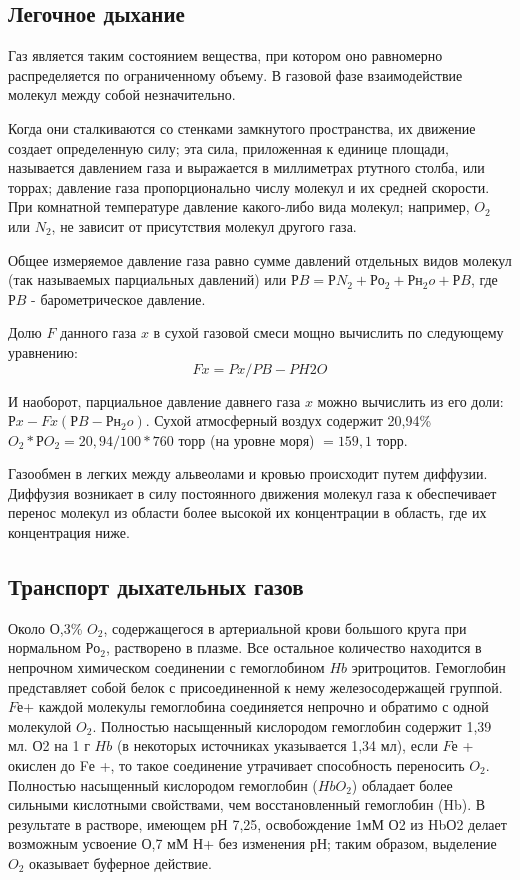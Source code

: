 \documentclass[a4paper,14pt]{extreport}
\begin{document}
\subsection{Легочное  дыхание}

Газ является таким состоянием вещества, при котором оно равномерно распределяется по ограниченному объему. В газовой фазе взаимодействие молекул между собой незначительно.

Когда они сталкиваются со стенками замкнутого пространства, их движение создает определенную силу; эта сила, приложенная к единице площади, называется давлением газа и выражается в миллиметрах ртутного столба, или торрах; давление газа пропорционально числу молекул и их средней скорости. При комнатной температуре давление какого-либо вида молекул; например, $O_2$ или $N_2$, не зависит от присутствия молекул другого газа. 

Общее измеряемое давление газа равно сумме давлений отдельных видов молекул (так называемых парциальных давлений) или $РB=РN_2+Ро_2+Рн_2o+РB$, где $РB$ - барометрическое давление. 

Долю $F$ данного газа $x$ в сухой газовой смеси мощно вычислить по следующему уравнению:
               $$ Fx=Px/PB-PH2O $$

И наоборот, парциальное давление давнего газа $x$ можно вычислить из его доли: $Рx-Fx(РB-Рн_2o)$. Сухой атмосферный воздух содержит 20,94\% $O_2*РO_2=20,94/100*760$ торр  (на  уровне моря) $=159,1$ торр.

Газообмен в легких между альвеолами и кровью происходит путем диффузии. Диффузия возникает в силу постоянного движения молекул газа к обеспечивает перенос молекул из области более высокой их концентрации в область, где их концентрация ниже.

\subsection{Транспорт дыхательных газов}

Около О,3\% $O_2$, содержащегося в артериальной крови большого круга при нормальном $Ро_2$, растворено в плазме. Все остальное количество находится в непрочном химическом соединении с гемоглобином $Hb$ эритроцитов. Гемоглобин представляет собой белок с присоединенной к нему железосодержащей группой. $Fе $+ каждой молекулы гемоглобина соединяется непрочно и обратимо с одной молекулой $O_2$. Полностью насыщенный кислородом гемоглобин содержит 1,39 мл. О2 на 1 г $Hb$ (в некоторых источниках указывается 1,34 мл), если $Fе$ + окислен до Fе +, то такое соединение утрачивает способность переносить $O_2$.
Полностью насыщенный кислородом гемоглобин ($HbO_2$) обладает более сильными кислотными свойствами, чем восстановленный гемоглобин (Hb). В результате в растворе, имеющем рН 7,25, освобождение 1мМ О2 из HbО2 делает возможным усвоение О,7 мМ Н+ без изменения рН; таким образом, выделение $O_2$ оказывает буферное действие.
\end{document}

